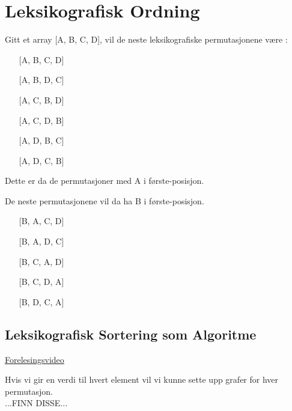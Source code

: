 \documentclass[11pt]{article}
\begin{document}
\newpage
\section{Leksikografisk Ordning}

\begin{multicols}{2}
	\raggedcolumns
	Gitt et array [A, B, C, D], vil de neste leksikografiske permutasjonene være : \\
	\begin{enumerate}
		\item[] [A, B, C, D]
		\item[] [A, B, D, C]
		\item[] [A, C, B, D]
		\item[] [A, C, D, B]
		\item[] [A, D, B, C]
		\item[] [A, D, C, B]
	\end{enumerate}
	Dette er da de permutasjoner med A i første-posisjon.

	\columnbreak

	De neste permutasjonene vil da ha B i første-posisjon. \\
	\begin{enumerate}
		\item[] [B, A, C, D]
		\item[] [B, A, D, C]
		\item[] [B, C, A, D]
		\item[] [B, C, D, A]
		\item[] [B, D, C, A]
	\end{enumerate}

\end{multicols}

\subsection{Leksikografisk Sortering som Algoritme}
\href{https://www.youtube.com/watch?v=6FdVfjSmxtA&ab_channel=Andr%C3%A9RiglandBrodtkorb}{Forelesingsvideo}

Hvis vi gir en verdi til hvert element vil vi kunne sette upp grafer for hver permutasjon. \\
...FINN DISSE...
\end{document}

